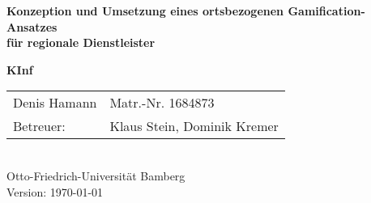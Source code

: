 \begin{titlepage}

{\sffamily
\vspace*{2cm}
\begin{center}
	\bfseries
	\LARGE {Konzeption und Umsetzung eines ortsbezogenen Gamification-Ansatzes\\
	für regionale Dienstleister}
\end{center}
\vspace{1cm}
\begin{center}

	{\Large\bfseries KInf\\[5mm]}

	\begin{tabular}{ll}
		Denis Hamann & Matr.-Nr. 1684873 \\[3mm]
		
		Betreuer: & Klaus Stein, Dominik Kremer \\[3mm]


	\end{tabular}\\[0.5cm]
	
{\scriptsize Otto-Friedrich-Universität Bamberg} \\[21pt]


{\footnotesize Version: \today }



\end{center}
}
\end{titlepage}
